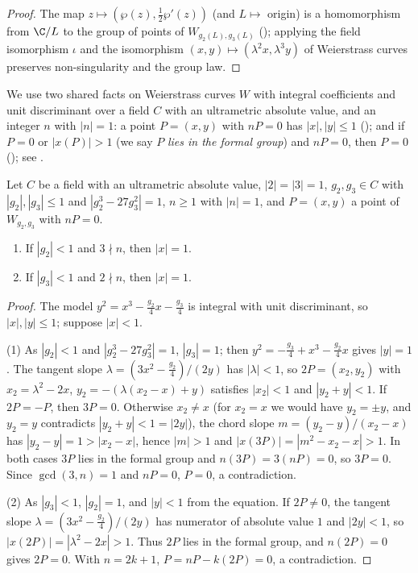 \begin{proof}
The map $z\mapsto(\wp(z),\frac12\wp'(z))$ (and $L\mapsto$ origin) is a homomorphism from $\C/L$ to the group of
points of $W_{g_2(L),g_3(L)}$ (); applying the field isomorphism $\iota$
and the isomorphism $(x,y)\mapsto(\lambda^2x,\lambda^3y)$ of Weierstrass curves preserves non-singularity and the
group law.
\end{proof}

We use two shared facts on Weierstrass curves $W$ with integral coefficients and unit discriminant over a field
$C$ with an ultrametric absolute value, and an integer $n$ with $|n|=1$: a point $P=(x,y)$ with $nP=0$ has
$|x|,|y|\le1$ (); and if $P=0$ or $|x(P)|>1$ (we say $P$ \emph{lies in
the formal group}) and $nP=0$, then $P=0$
(); see \cite[Ch.~VII]{Silverman2009}.

\begin{lemma}\label{pf:reckernel:torsUnit}
Let $C$ be a field with an ultrametric absolute value, $|2|=|3|=1$, $g_2,g_3\in C$ with $|g_2|,|g_3|\le1$ and
$|g_2^3-27g_3^2|=1$, $n\ge1$ with $|n|=1$, and $P=(x,y)$ a point of $W_{g_2,g_3}$ with $nP=0$.
\begin{enumerate}
\item If $|g_2|<1$ and $3\nmid n$, then $|x|=1$.
\item If $|g_3|<1$ and $2\nmid n$, then $|x|=1$.
\end{enumerate}
\end{lemma}

\begin{proof}
The model $y^2=x^3-\frac{g_2}4x-\frac{g_3}4$ is integral with unit discriminant, so $|x|,|y|\le1$; suppose $|x|<1$.

(1) As $|g_2|<1$ and $|g_2^3-27g_3^2|=1$, $|g_3|=1$; then $y^2=-\frac{g_3}4+x^3-\frac{g_2}4x$ gives $|y|=1$. The
tangent slope $\lambda=(3x^2-\frac{g_2}4)/(2y)$ has $|\lambda|<1$, so $2P=(x_2,y_2)$ with $x_2=\lambda^2-2x$,
$y_2=-(\lambda(x_2-x)+y)$ satisfies $|x_2|<1$ and $|y_2+y|<1$. If $2P=-P$, then $3P=0$. Otherwise $x_2\ne x$ (for
$x_2=x$ we would have $y_2=\pm y$, and $y_2=y$ contradicts $|y_2+y|<1=|2y|$), the chord slope
$m=(y_2-y)/(x_2-x)$ has $|y_2-y|=1>|x_2-x|$, hence $|m|>1$ and $|x(3P)|=|m^2-x_2-x|>1$. In both cases $3P$ lies in
the formal group and $n(3P)=3(nP)=0$, so $3P=0$. Since $\gcd(3,n)=1$ and $nP=0$, $P=0$, a contradiction.

(2) As $|g_3|<1$, $|g_2|=1$, and $|y|<1$ from the equation. If $2P\ne0$, the tangent slope
$\lambda=(3x^2-\frac{g_2}4)/(2y)$ has numerator of absolute value $1$ and $|2y|<1$, so $|x(2P)|=|\lambda^2-2x|>1$.
Thus $2P$ lies in the formal group, and $n(2P)=0$ gives $2P=0$. With $n=2k+1$, $P=nP-k(2P)=0$, a contradiction.
\end{proof}

